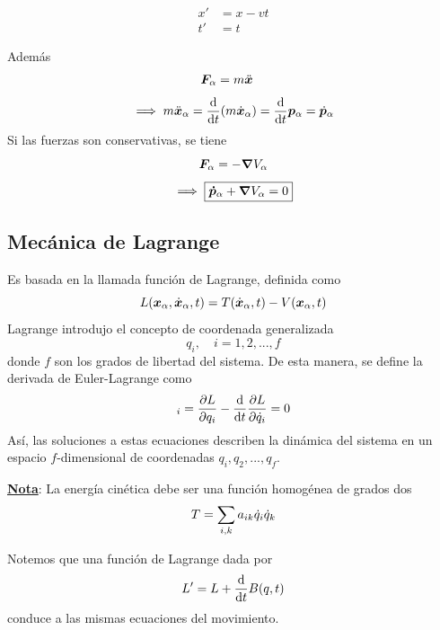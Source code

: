 \begin{align}
  x'&=x-vt\\
  t'&=t
\end{align}

Además
\begin{align}
  \vb*{F}_\alpha &=m\ddot{\vb*{x}}
\end{align}
\begin{equation}
	\implies m\ddot{\vb*{x}}_\alpha =\dv{t}(m\dot{\vb*{x}}_\alpha )=\dv{t}\vb*{p}_\alpha =\dot{\vb*{p}}_\alpha 
\end{equation}
Si las fuerzas son conservativas, se tiene
\begin{equation}
  \vb*{F}_\alpha =-\vb*{\nabla} V_\alpha 
\end{equation}
\begin{equation}
  \implies \boxed{\vb*{\dot{p}}_\alpha +\vb*{\nabla}V_\alpha =0}
\end{equation}

\subsection{Mecánica de Lagrange}
Es basada en la llamada función de Lagrange, definida como
\begin{equation}
  L(\vb*{x}_\alpha ,\dot{\vb*{x}}_\alpha ,t)=T(\dot{\vb*{x}}_\alpha ,t)-V(\vb*{x}_\alpha ,t)
\end{equation}
Lagrange introdujo el concepto de coordenada generalizada
\begin{equation}
  q_i,\quad i=1,2,...,f
\end{equation}
donde $f$ son los grados de libertad del sistema. De esta manera, se define la derivada de Euler-Lagrange como
\begin{equation}
  [L]_i=\EL=0
\end{equation}
Así, las soluciones a estas ecuaciones describen la dinámica del sistema en un espacio $f$-dimensional de coordenadas $q_i,q_2,...,q_f$.

\underline{\textbf{Nota}}: La energía cinética debe ser una función homogénea de grados dos
\begin{equation}
  T=\sum_{i,k} a_{ik}\dot{q}_i\dot{q}_k
\end{equation}

Notemos que una función de Lagrange dada por
\begin{equation}
  L'=L+\dv{t}B(q,t)
\end{equation}
conduce a las mismas ecuaciones del movimiento.

